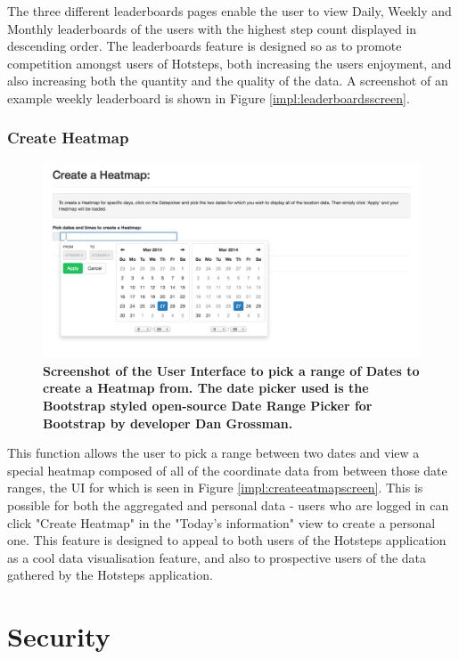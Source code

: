 \documentclass{l4proj}
\begin{document}
The three different leaderboards pages enable the user to view Daily, Weekly and Monthly leaderboards of the users with the highest step count displayed in descending order. The leaderboards feature is designed so as to promote competition amongst users of Hotsteps, both increasing the users enjoyment, and also increasing both the quantity and the quality of the data. A screenshot of an example weekly leaderboard is shown in Figure  \ref{impl:leaderboardsscreen}.

\subsubsection{Create Heatmap}

\begin{figure}[ht!]
\centering
\includegraphics[scale=0.4]{images/screenshots/createheatmapscreen.png}
\caption{\textbf{Screenshot of the User Interface to pick a range of Dates to create a Heatmap from. The date picker used is the Bootstrap styled open-source Date Range Picker for Bootstrap by developer Dan Grossman.}}
\label{impl:createheatmapscreen}
\end{figure}

This function allows the user to pick a range between two dates and view a special heatmap composed of all of the coordinate data from between those date ranges, the UI for which is seen in Figure \ref{impl:createeatmapscreen}. This is possible for both the aggregated and personal data - users who are logged in can click "Create Heatmap" in the "Today's information" view to create a personal one. This feature is designed to appeal to both users of the Hotsteps application as a cool data visualisation feature, and also to prospective users of the data gathered by the Hotsteps application.

\section{Security}
\end{document}
